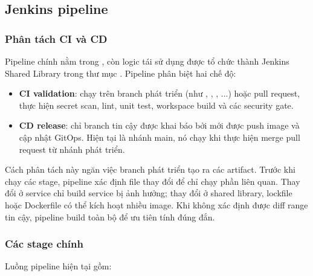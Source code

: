 \subsection{Jenkins pipeline}

\subsubsection{Phân tách CI và CD}

Pipeline chính nằm trong , còn logic tái sử dụng được tổ chức thành Jenkins Shared Library trong thư mục . Pipeline phân biệt hai chế độ:

\begin{itemize}
  \item \textbf{CI validation}: chạy trên branch phát triển (như , , , ...) hoặc pull request, thực hiện secret scan, lint, unit test, workspace build và các security gate.
  \item \textbf{CD release}: chỉ branch tin cậy được khai báo bởi  mới được push image và cập nhật GitOps. Hiện tại  là nhánh main, nó chạy khi thực hiện merge pull request từ nhánh phát triển.
\end{itemize}

Cách phân tách này ngăn việc branch phát triển tạo ra các artifact. Trước khi chạy các stage, pipeline xác định file thay đổi để chỉ chạy phần liên quan. Thay đổi ở service chỉ build service bị ảnh hưởng; thay đổi ở shared library, lockfile hoặc Dockerfile có thể kích hoạt nhiều image. Khi không xác định được diff range tin cậy, pipeline build toàn bộ để ưu tiên tính đúng đắn.

\subsubsection{Các stage chính}

Luồng pipeline hiện tại gồm:


